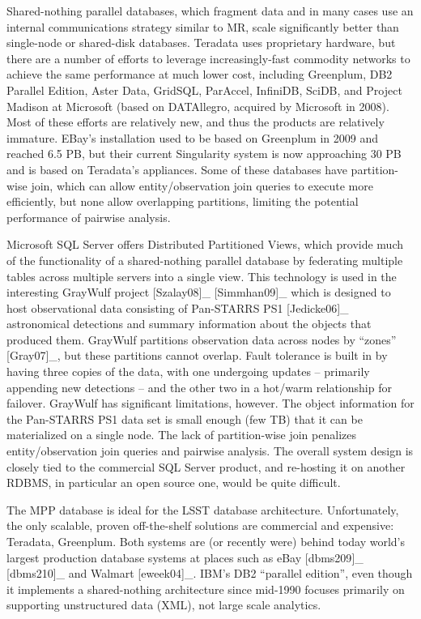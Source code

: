 \documentclass[DM,lsstdraft,toc]{lsstdoc}
\begin{document}
Shared-nothing parallel databases, which fragment data and in many cases
use an internal communications strategy similar to MR, scale
significantly better than single-node or shared-disk databases. Teradata
uses proprietary hardware, but there are a number of efforts to leverage
increasingly-fast commodity networks to achieve the same performance at
much lower cost, including Greenplum, DB2 Parallel Edition, Aster Data,
GridSQL, ParAccel, InfiniDB, SciDB, and Project Madison at Microsoft
(based on DATAllegro, acquired by Microsoft in 2008). Most of these
efforts are relatively new, and thus the products are relatively
immature. EBay's installation used to be based on Greenplum in 2009 and
reached 6.5 PB, but their current Singularity system is now approaching
30 PB and is based on Teradata's appliances. Some of these databases
have partition-wise join, which can allow entity/observation join
queries to execute more efficiently, but none allow overlapping
partitions, limiting the potential performance of pairwise analysis.

Microsoft SQL Server offers Distributed Partitioned Views, which provide
much of the functionality of a shared-nothing parallel database by
federating multiple tables across multiple servers into a single view.
This technology is used in the interesting GrayWulf project
{[}Szalay08{]}\_ {[}Simmhan09{]}\_ which is designed to host
observational data consisting of Pan-STARRS PS1 {[}Jedicke06{]}\_
astronomical detections and summary information about the objects that
produced them. GrayWulf partitions observation data across nodes by
``zones'' {[}Gray07{]}\_, but these partitions cannot overlap. Fault
tolerance is built in by having three copies of the data, with one
undergoing updates -- primarily appending new detections -- and the
other two in a hot/warm relationship for failover. GrayWulf has
significant limitations, however. The object information for the
Pan-STARRS PS1 data set is small enough (few TB) that it can be
materialized on a single node. The lack of partition-wise join penalizes
entity/observation join queries and pairwise analysis. The overall
system design is closely tied to the commercial SQL Server product, and
re-hosting it on another RDBMS, in particular an open source one, would
be quite difficult.

The MPP database is ideal for the LSST database architecture.
Unfortunately, the only scalable, proven off-the-shelf solutions are
commercial and expensive: Teradata, Greenplum. Both systems are (or
recently were) behind today world's largest production database systems
at places such as eBay {[}dbms209{]}\_ {[}dbms210{]}\_ and Walmart
{[}eweek04{]}\_. IBM's DB2 ``parallel edition'', even though it
implements a shared-nothing architecture since mid-1990 focuses
primarily on supporting unstructured data (XML), not large scale
analytics.
\end{document}
